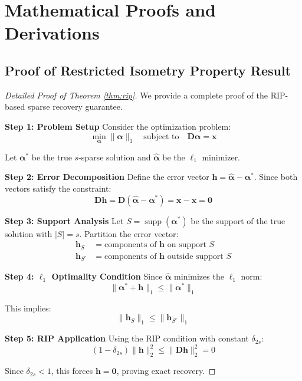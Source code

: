 \documentclass[12pt]{article}
\renewcommand{\vec}[1]{\mathbf{#1}}
\DeclareMathOperator{\supp}{supp}
\newcommand{\dictionary}{\mathbf{D}}
\newcommand{\coeff}{\boldsymbol{\alpha}}
\begin{document}
\appendix

\section{Mathematical Proofs and Derivations}
\label{app:proofs}

\subsection{Proof of Restricted Isometry Property Result}
\label{app:rip_proof}

\begin{proof}[Detailed Proof of Theorem \ref{thm:rip}]
    We provide a complete proof of the RIP-based sparse recovery guarantee.

    \textbf{Step 1: Problem Setup}
    Consider the optimization problem:
    \begin{equation}
        \min_{\coeff} \|\coeff\|_1 \quad \text{subject to} \quad \dictionary\coeff = \vec{x}
    \end{equation}

    Let $\coeff^*$ be the true $s$-sparse solution and $\hat{\coeff}$ be the $\ell_1$ minimizer.

    \textbf{Step 2: Error Decomposition}
    Define the error vector $\vec{h} = \hat{\coeff} - \coeff^*$. Since both vectors satisfy the constraint:
    \begin{equation}
        \dictionary\vec{h} = \dictionary(\hat{\coeff} - \coeff^*) = \vec{x} - \vec{x} = \vec{0}
    \end{equation}

    \textbf{Step 3: Support Analysis}
    Let $S = \supp(\coeff^*)$ be the support of the true solution with $|S| = s$. Partition the error vector:
    \begin{align}
        \vec{h}_S     & = \text{components of } \vec{h} \text{ on support } S      \\
        \vec{h}_{S^c} & = \text{components of } \vec{h} \text{ outside support } S
    \end{align}

    \textbf{Step 4: $\ell_1$ Optimality Condition}
    Since $\hat{\coeff}$ minimizes the $\ell_1$ norm:
    \begin{equation}
        \|\coeff^* + \vec{h}\|_1 \leq \|\coeff^*\|_1
    \end{equation}

    This implies:
    \begin{equation}
        \|\vec{h}_S\|_1 \leq \|\vec{h}_{S^c}\|_1
    \end{equation}

    \textbf{Step 5: RIP Application}
    Using the RIP condition with constant $\delta_{2s}$:
    \begin{equation}
        (1 - \delta_{2s})\|\vec{h}\|_2^2 \leq \|\dictionary\vec{h}\|_2^2 = 0
    \end{equation}

    Since $\delta_{2s} < 1$, this forces $\vec{h} = \vec{0}$, proving exact recovery.
\end{proof}
\end{document}
